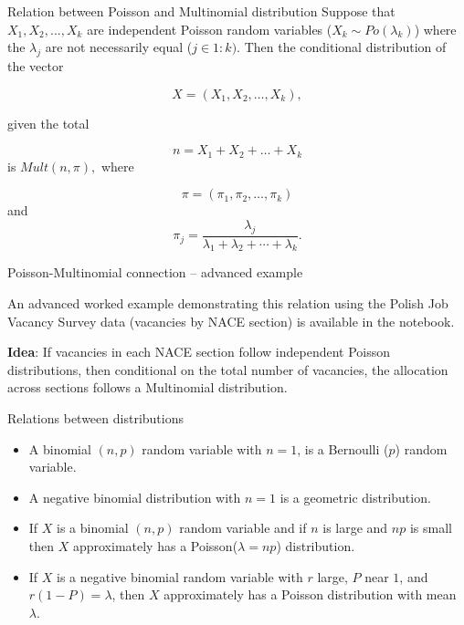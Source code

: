 \documentclass[10pt,ignorenonframetext,aspectratio=169]{beamer}
\begin{document}
\begin{frame}{Relation between Poisson and Multinomial distribution}
Suppose that $X_1, X_2, ..., X_k$ are independent Poisson random variables ($X_k \sim Po(\lambda_k)$) where the $\lambda_j$ are not necessarily equal ($j \in 1:k)$. Then the conditional distribution of the vector

\begin{equation}
    X=(X_1,X_2,\ldots,X_k),
\end{equation}

given the total

\begin{equation}
    n=X_1+X_2+\ldots+X_k
\end{equation}
is $Mult(n, \pi),$  where

\begin{equation}
    \pi=(\pi_1,\pi_2,\ldots,\pi_k)
\end{equation}
and
\begin{equation}
    \pi_j=\dfrac{\lambda_j}{\lambda_1+\lambda_2+\cdots+\lambda_k}.
\end{equation}

\end{frame}

\begin{frame}{Poisson-Multinomial connection -- advanced example}

An advanced worked example demonstrating this relation using the Polish Job Vacancy Survey data (vacancies by NACE section) is available in the notebook.

\vspace{0.5cm}

\textbf{Idea}: If vacancies in each NACE section follow independent Poisson distributions, then conditional on the total number of vacancies, the allocation across sections follows a Multinomial distribution.

\end{frame}


\begin{frame}[fragile]{Relations between distributions}

\begin{itemize}
    \item A binomial $(n, p)$ random variable with $n = 1$, is a Bernoulli ($p$) random variable.
    \item A negative binomial distribution with $n = 1$ is a geometric distribution.
    \item If $X$ is a binomial $(n, p)$ random variable and if $n$ is large and $np$ is small then $X$ approximately has a Poisson($\lambda=np$) distribution.
    \item If $X$ is a negative binomial random variable with $r$ large, $P$ near $1$, and $r(1-P) = \lambda$, then $X$ approximately has a Poisson distribution with mean $\lambda$.
\end{itemize}

\end{frame}
\end{document}
